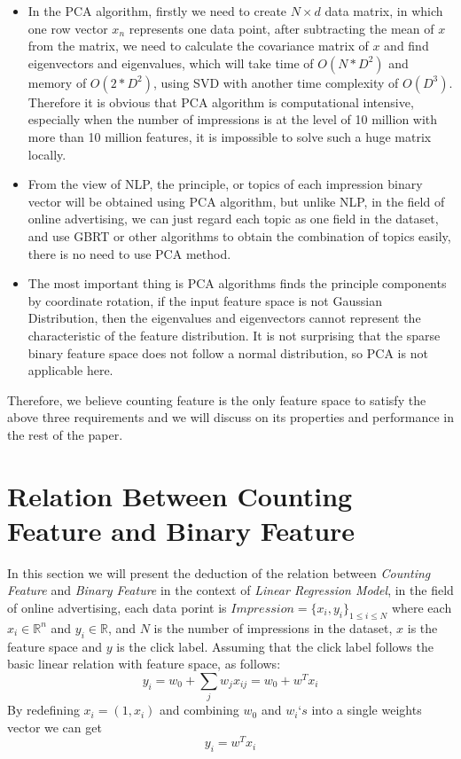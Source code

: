 \begin{itemize}
  \item In the PCA algorithm, firstly we need to create \(N \times d\) data matrix, in which one row vector \(x_n\) represents one data point, after subtracting the mean of \(x\) from the matrix, we need to calculate the covariance matrix of \(x\) and find eigenvectors and eigenvalues, which will take time of \(O(N*D^2)\) and memory of \(O(2*D^2)\), using SVD with another time complexity of \(O(D^3)\). Therefore it is obvious that PCA algorithm is computational intensive, especially when the number of impressions is at the level of 10 million with more than 10 million features, it is impossible to solve such a huge matrix locally. 
  \item From the view of NLP, the principle, or topics of each impression binary vector will be obtained using PCA algorithm, but unlike NLP, in the field of online advertising, we can just regard each topic as one field in the dataset, and use GBRT or other algorithms to obtain the combination of topics easily, there is no need to use PCA method.
  \item The most important thing is PCA algorithms finds the principle components by coordinate rotation, if the input feature space is not Gaussian Distribution, then the eigenvalues and eigenvectors cannot represent the characteristic of the feature distribution. It is not surprising that the sparse binary feature space does not follow a normal distribution, so PCA is not applicable here. 
\end{itemize}

Therefore, we believe counting feature is the only feature space to satisfy the above three requirements and we will discuss on its properties and performance in the rest of the paper. 


\section{Relation Between Counting Feature and Binary Feature}
In this section we will present the deduction of the relation between \textit{Counting Feature} and \textit{Binary Feature} in the context of \textit{Linear Regression Model}, in the field of online advertising, each data porint is \(Impression = \{ x_i,y_i \}_{1 \leq i \leq N}\)  where each \(x_i  \in \mathbb{R}^n\) and \(y_i \in \mathbb{R}\), and \(N\) is the number of impressions in the dataset, \(x\) is the feature space and \(y\) is the click label. Assuming that the click label follows the basic linear relation with feature space, as follows:
\begin{equation}
y_i =w_0 +\sum_j w_j x_{ij} =w_0 +w^T x_i 
\end{equation}
By redefining \(x_i = (1,x_i)\) and combining \(w_0\) and \(w_i‘s\) into a single weights vector we can get 
\begin{equation}
y_ i = w^T x_i 
\end{equation}

